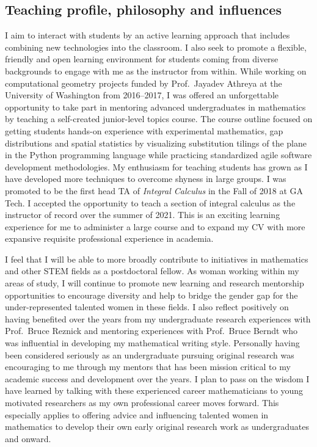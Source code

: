 \documentclass[10pt,reqno,letterpaper]{article}
\theoremstyle{plain}
\numberwithin{theorem}{section}
\theoremstyle{definition}
\begin{document}
\subsection{Teaching profile, philosophy and influences} 

I aim to interact with students by an active learning approach 
that includes combining new technologies into the classroom. 
I also seek to promote a flexible, friendly and open learning environment for 
students coming from diverse backgrounds to engage with me as the instructor from within.
While working on computational geometry projects funded by 
Prof.~Jayadev Athreya at the University of Washington from 2016--2017, 
I was offered an unforgettable opportunity to take part in mentoring advanced undergraduates 
in mathematics by teaching a self-created junior-level topics course. The course outline 
focused on getting students hands-on experience with experimental mathematics, 
gap distributions and spatial statistics by visualizing substitution tilings of the 
plane in the Python programming language while practicing 
standardized agile software development methodologies. 
My enthusiasm for teaching students 
has grown as I have developed more techniques to overcome shyness in large groups. 
I was promoted to be the first head TA of \emph{Integral Calculus} in the Fall of 2018 at GA Tech. 
I accepted the opportunity to teach a section of integral calculus 
as the instructor of record over the summer of 2021. 
This is an exciting learning experience for me to administer a large course 
and to expand my CV with more expansive requisite professional experience in academia. 

I feel that I will be able to more broadly contribute 
to initiatives in mathematics and other STEM fields as a 
postdoctoral fellow. 
As woman working within my areas of study, I will continue to promote new learning 
and research mentorship opportunities to encourage diversity and help to bridge the gender 
gap for the under-represented talented women in these fields.
I also reflect positively on having benefited over the years from my undergraduate research experiences 
with Prof.~Bruce Reznick and 
mentoring experiences with Prof.~Bruce Berndt who was influential in 
developing my mathematical writing style.
Personally having been considered seriously as an 
undergraduate pursuing original research was encouraging to me through 
my mentors that has been mission critical to my academic success and development over the years. 
I plan to pass on the wisdom I have learned
by talking with these experienced career mathematicians to young motivated researchers as my 
own professional career moves forward. This especially applies to offering advice and 
influencing talented women in mathematics to develop their own early original 
research work as undergraduates and onward. 
\end{document}
